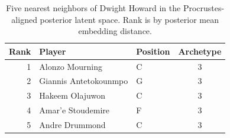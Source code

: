 \begin{table}[htbp]
  \centering\small
  \begin{tabular}{rllc}
    \toprule
    Rank & Player & Position & Archetype \\
    \midrule
    1 & Alonzo Mourning & C & 3 \\
    2 & Giannis Antetokounmpo & G & 3 \\
    3 & Hakeem Olajuwon & C & 3 \\
    4 & Amar'e Stoudemire & F & 3 \\
    5 & Andre Drummond & C & 3 \\
    \bottomrule
  \end{tabular}
  \caption{Five nearest neighbors of Dwight Howard in the Procrustes-aligned posterior latent space. Rank is by posterior mean embedding distance.}
  \label{tab:Dwight_Howard_neighbors}
\end{table}

